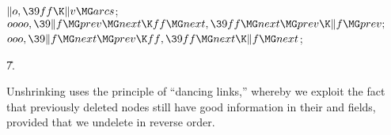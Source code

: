\2\6
${}\|o,\39\\{ff}\K\|v\MG\\{arcs}{}$;\6
${}\\{oooo},\39\|f\MG\\{prev}\MG\\{next}\K\\{ff}\MG\\{next},\39\\{ff}\MG%
\\{next}\MG\\{prev}\K\|f\MG\\{prev};{}$\6
${}\\{ooo},\39\|f\MG\\{next}\MG\\{prev}\K\\{ff},\39\\{ff}\MG\\{next}\K\|f\MG%
\\{next}{}$;\par
\U7.\fi

Unshrinking uses the principle of ``dancing links,'' whereby we exploit
the fact that previously deleted nodes still have good information in
their  and  fields, provided that we undelete in
reverse order.

